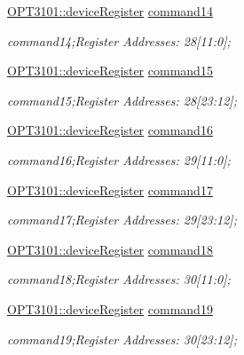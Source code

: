 \begin{DoxyCompactItemize}
\mbox{\hyperlink{class_o_p_t3101_1_1device_register}{O\+P\+T3101\+::device\+Register}} \mbox{\hyperlink{class_o_p_t3101_1_1registers_ae5cea2e83529be09c4cb484edc3a8163}{command14}}
\begin{DoxyCompactList}\small\item\em command14;Register Addresses\+: 28\mbox{[}11\+:0\mbox{]}; \end{DoxyCompactList}\item 
\mbox{\hyperlink{class_o_p_t3101_1_1device_register}{O\+P\+T3101\+::device\+Register}} \mbox{\hyperlink{class_o_p_t3101_1_1registers_a6b7f9c4279808c041096d4b2b7f3d44a}{command15}}
\begin{DoxyCompactList}\small\item\em command15;Register Addresses\+: 28\mbox{[}23\+:12\mbox{]}; \end{DoxyCompactList}\item 
\mbox{\hyperlink{class_o_p_t3101_1_1device_register}{O\+P\+T3101\+::device\+Register}} \mbox{\hyperlink{class_o_p_t3101_1_1registers_aa1165c37fd9c29c5d036651597fee639}{command16}}
\begin{DoxyCompactList}\small\item\em command16;Register Addresses\+: 29\mbox{[}11\+:0\mbox{]}; \end{DoxyCompactList}\item 
\mbox{\hyperlink{class_o_p_t3101_1_1device_register}{O\+P\+T3101\+::device\+Register}} \mbox{\hyperlink{class_o_p_t3101_1_1registers_a3ed3c3a38ee26317db4c08fd08bf58c3}{command17}}
\begin{DoxyCompactList}\small\item\em command17;Register Addresses\+: 29\mbox{[}23\+:12\mbox{]}; \end{DoxyCompactList}\item 
\mbox{\hyperlink{class_o_p_t3101_1_1device_register}{O\+P\+T3101\+::device\+Register}} \mbox{\hyperlink{class_o_p_t3101_1_1registers_a6a1a67503b4b7b9e5de9035c105615ca}{command18}}
\begin{DoxyCompactList}\small\item\em command18;Register Addresses\+: 30\mbox{[}11\+:0\mbox{]}; \end{DoxyCompactList}\item 
\mbox{\hyperlink{class_o_p_t3101_1_1device_register}{O\+P\+T3101\+::device\+Register}} \mbox{\hyperlink{class_o_p_t3101_1_1registers_ac78d7ff66db69a0ae173890e9e777b2f}{command19}}
\begin{DoxyCompactList}\small\item\em command19;Register Addresses\+: 30\mbox{[}23\+:12\mbox{]}; \end{DoxyCompactList}\item 

\end{DoxyCompactItemize}
